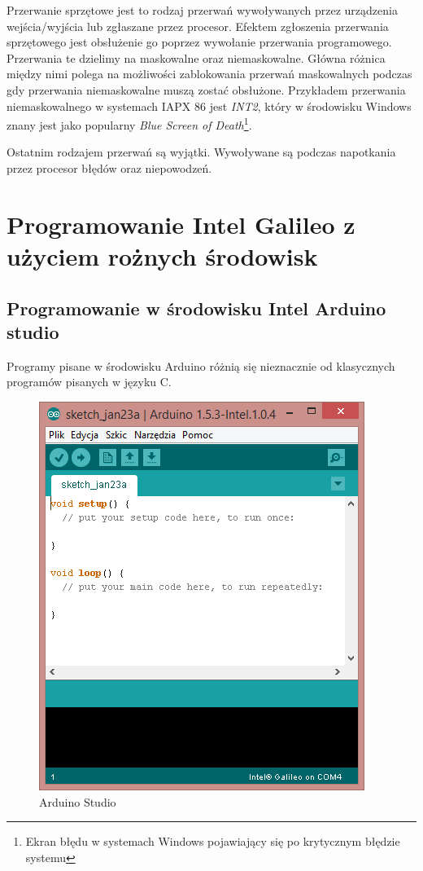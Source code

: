 \documentclass{xmgr}
\begin{document}
Przerwanie sprzętowe jest to rodzaj przerwań wywoływanych przez urządzenia wejścia/wyjścia lub zgłaszane przez procesor. Efektem zgłoszenia przerwania sprzętowego jest obsłużenie go poprzez wywołanie przerwania programowego. Przerwania te dzielimy na maskowalne oraz niemaskowalne. Główna różnica między nimi polega na możliwości zablokowania przerwań maskowalnych podczas gdy przerwania niemaskowalne muszą zostać obsłużone. Przykładem przerwania niemaskowalnego w systemach IAPX 86 jest \emph{INT2}, który w środowisku Windows znany jest jako popularny \emph{Blue Screen of Death}\footnote{Ekran błędu w systemach Windows pojawiający się po krytycznym błędzie systemu}.

Ostatnim rodzajem przerwań są wyjątki. Wywoływane są podczas napotkania przez procesor błędów oraz niepowodzeń.

\chapter{Programowanie Intel Galileo z użyciem rożnych środowisk}
\section{Programowanie w środowisku Intel Arduino studio}
Programy pisane w środowisku Arduino różnią się nieznacznie od klasycznych programów pisanych w języku C. 

\begin{figure}[!h]
    \centering
    	\includegraphics[height=0.3\textheight]{images/AS.png}
    \caption{Arduino Studio}
\end{figure}
\end{document}
